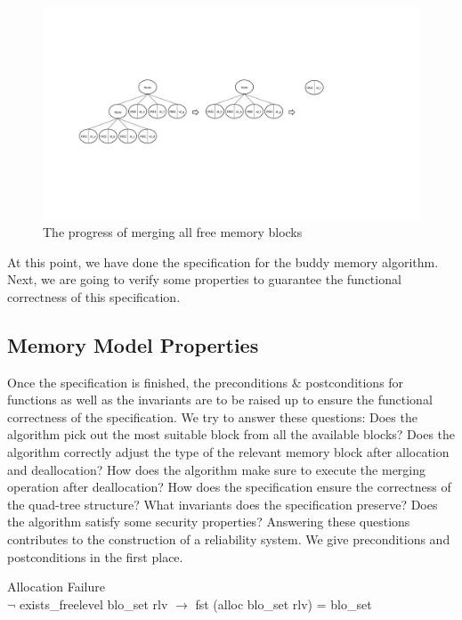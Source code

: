 \documentclass[runningheads]{llncs}
\begin{document}
\begin{figure}
\centering
\includegraphics[width=1\textwidth]{fig2.pdf}
\caption{The progress of merging all free memory blocks}
\label{fig2}
\end{figure}

At this point, we have done the specification for the buddy memory algorithm. Next, we are going to verify some properties to guarantee the functional correctness of this specification.


\subsection{Memory Model Properties}
Once the specification is finished, the preconditions $\&$ postconditions for functions as well as the invariants are to be raised up to ensure the functional correctness of the specification. We try to answer these questions: Does the algorithm pick out the most suitable block from all the available blocks? Does the algorithm correctly adjust the type of the relevant memory block after allocation and deallocation? How does the algorithm make sure to execute the merging operation after deallocation? How does the specification ensure the correctness of the quad-tree structure? What invariants does the specification preserve? Does the algorithm satisfy some security properties? Answering these questions contributes to the construction of a reliability system. We give preconditions and postconditions in the first place.

\begin{definition} {Allocation Failure} \\
$\neg$ exists\_freelevel blo\_set rlv $\longrightarrow$ fst (alloc blo\_set rlv) = blo\_set
\end{definition}
\end{document}
